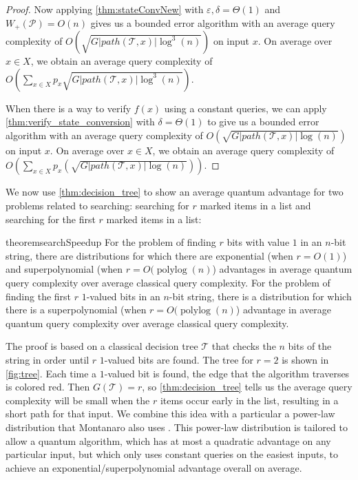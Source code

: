 \documentclass[cleveref, autoref, thm-restate,11pt]{article}
\theoremstyle{definition}
\newcommand{\sop}[1]{{\mathcal #1}}
\def\polylog{\operatorname{polylog}}
\begin{document}
\begin{proof}
Now applying \cref{thm:stateConvNew} with $\varepsilon,\delta=\Theta(1)$ and $W_+(\mathscr P)=O(n)$ gives us a bounded
error algorithm with an average
query complexity of $O\left(\sqrt{G|path(\sop T,x)|\log^3(n)}\right)$ on input $x$. 
On average over $x\in X$, we obtain an average query complexity of 
$ O\left(\sum_{x\in X}p_x\sqrt{G|path(\sop T,x)|\log^3(n)}\right).$

When there is a way to verify $f(x)$ using a constant queries,
we can apply \cref{thm:verify_state_conversion} with $\delta=\Theta(1)$ 
to give us a bounded error algorithm with an average
query complexity of $O\left(\sqrt{G|path(\sop T,x)|\log(n)}\right)$
on input $x$. 
On average over $x\in X$, we obtain an average query complexity of 
$ O\left(\sum_{x\in X}p_x\left(\sqrt{G|path(\sop T,x)|\log(n)}\right)\right).$
\end{proof}



We now use \cref{thm:decision_tree} to show an average quantum advantage for
two problems related to searching: searching for $r$ marked items in a list and searching for the first
$r$ marked items in a list:

\begin{restatable}{theorem}{searchSpeedup}\label{thm:search_speedup} For the problem of finding $r$
bits with value $1$ in an  $n$-bit string, there are distributions for which
 there are exponential (when $r=O(1)$) and superpolynomial (when $r=O
 (\polylog(n)$) advantages in average quantum  query complexity over average
 classical query complexity. For the problem of finding the first $r$ $1$-valued bits
 in an $n$-bit string, there is a distribution for which there is
 a superpolynomial (when $r=O(\polylog
 (n)$) advantage in average quantum  query complexity over average classical
 query complexity.
\end{restatable} 

The proof is based on a classical decision tree $\sop T$ that checks the
$n$ bits of the string in order until $r$ $1$-valued bits are found. The tree
for $r=2$ is shown in \cref{fig:tree}. Each time a $1$-valued bit is found, the edge
that the algorithm traverses is colored red. Then $G(\sop T)=r$, so \cref{thm:decision_tree} tells us the average query complexity will be small when the $r$ items occur early in the list, resulting in a short path for that input. We combine
this idea with 
a particular a power-law distribution that Montanaro also uses \cite{montanaro2010quantum}. 
This power-law distribution is tailored to allow a quantum algorithm, which has at most a
quadratic advantage on any particular input, but which only uses constant queries
on the easiest inputs, to 
achieve an exponential/superpolynomial advantage overall on average.
\end{document}
